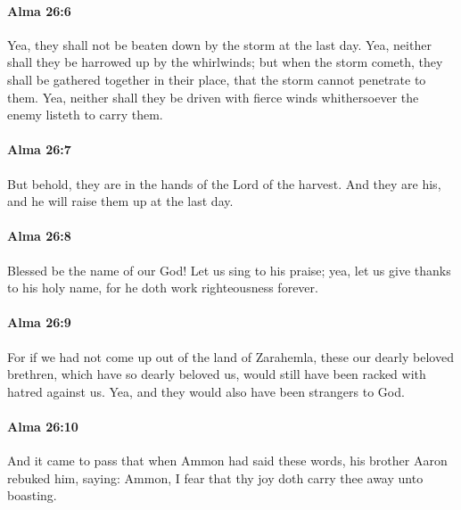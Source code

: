 		\paragraph{Alma 26:6} %
			\label{ALMA-26-6}

			Yea, they shall not be beaten down by the storm at the last day.
			Yea, neither shall they be harrowed up by the whirlwinds;
			but when the storm cometh, they shall be gathered together in their place,
			that the storm cannot penetrate to them.
			Yea, neither shall they be driven with fierce winds
			whithersoever the enemy listeth to carry them.

		\paragraph{Alma 26:7} %
			\label{ALMA-26-7}

			But behold, they are in the hands of the Lord of the harvest.
			And they are his, and he will raise them up at the last day.

		\paragraph{Alma 26:8} %
			\label{ALMA-26-8}

			Blessed be the name of our God!
			Let us sing to his praise;
			yea, let us give thanks to his holy name,
			for he doth work righteousness forever.

		\paragraph{Alma 26:9} %
			\label{ALMA-26-9}

			For if we had not come up out of the land of Zarahemla,
			these our dearly beloved brethren, which have so dearly beloved us,
			would still have been racked with hatred against us.
			Yea, and they would also have been strangers to God.

		\paragraph{Alma 26:10} %
			\label{ALMA-26-10}

			And it came to pass that when Ammon had said these words,
			his brother Aaron rebuked him, saying:
			Ammon, I fear that thy joy doth carry thee away unto boasting.

